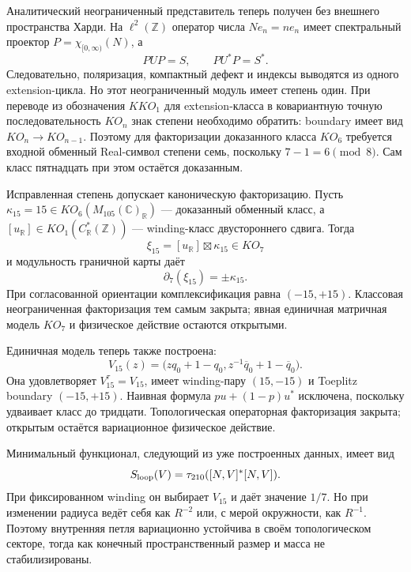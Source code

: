 Аналитический неограниченный представитель теперь получен без внешнего
пространства Харди. На $\ell^2(\mathbb Z)$ оператор числа
$Ne_n=ne_n$ имеет спектральный проектор
$P=\chi_{[0,\infty)}(N)$, а
\begin{equation}
 PUP=S,
 \qquad
 PU^*P=S^*.
\end{equation}
Следовательно, поляризация, компактный дефект и индексы выводятся из
одного extension-цикла. Но этот неограниченный модуль имеет степень один.
При переводе из обозначения $KKO_1$ для extension-класса в ковариантную
точную последовательность $KO_n$ знак степени необходимо обратить:
boundary имеет вид $KO_n\to KO_{n-1}$. Поэтому для факторизации
доказанного класса $KO_6$ требуется входной обменный Real-символ степени
семь, поскольку $7-1=6\pmod8$. Сам класс пятнадцать при этом остаётся
доказанным.

Исправленная степень допускает каноническую факторизацию. Пусть
$\kappa_{15}=15\in KO_6(M_{105}(\mathbb C)_{\mathbb R})$ --- доказанный
обменный класс, а $[u_{\mathbb R}]\in KO_1(C^*_{\mathbb R}(\mathbb Z))$
--- winding-класс двустороннего сдвига. Тогда
\begin{equation}
 \xi_{15}=[u_{\mathbb R}]\boxtimes\kappa_{15}\in KO_7
\end{equation}
и модульность граничной карты даёт
\begin{equation}
 \partial_7(\xi_{15})=\pm\kappa_{15}.
\end{equation}
При согласованной ориентации комплексификация равна $(-15,+15)$.
Классовая неограниченная факторизация тем самым закрыта; явная единичная
матричная модель $KO_7$ и физическое действие остаются открытыми.

Единичная модель теперь также построена:
\begin{equation}
 V_{15}(z)=\bigl(zq_0+1-q_0,
 z^{-1}\overline q_0+1-\overline q_0\bigr).
\end{equation}
Она удовлетворяет $V_{15}^{\tau}=V_{15}$, имеет winding-пару
$(15,-15)$ и Toeplitz boundary $(-15,+15)$. Наивная формула
$pu+(1-p)u^*$ исключена, поскольку удваивает класс до тридцати.
Топологическая операторная факторизация закрыта; открытым остаётся
вариационное физическое действие.

Минимальный функционал, следующий из уже построенных данных, имеет вид
\begin{equation}
 S_{\rm loop}(V)=\tau_{210}([N,V]^*[N,V]).
\end{equation}
При фиксированном winding он выбирает $V_{15}$ и даёт значение $1/7$.
Но при изменении радиуса ведёт себя как $R^{-2}$ или, с мерой окружности,
как $R^{-1}$. Поэтому внутренняя петля вариационно устойчива в своём
топологическом секторе, тогда как конечный пространственный размер и
масса не стабилизированы.